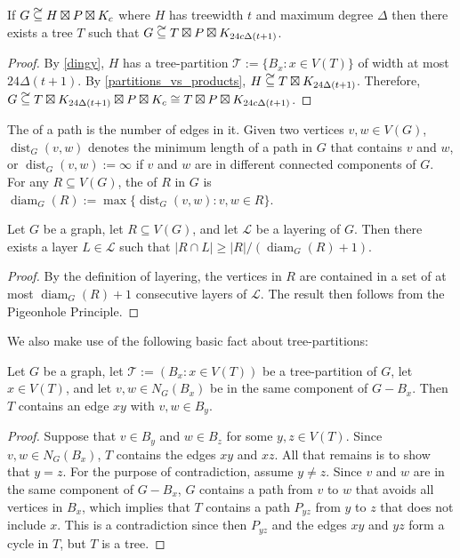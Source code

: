 \documentclass{patmorin}
\DeclareMathOperator{\dist}{dist}
\DeclareMathOperator{\diam}{diam}
\newcommand\subsetcong{\mathrel{\text{%
    \setbox0\hbox{$\subseteq$}%
    \rlap{\hbox to \wd0{\hss\hss\hss\raisebox{1.5\height}{$\sim$}\hss}}\box0
}}}
\renewcommand{\ge}{\geqslant}
\begin{document}
\begin{cor}\label{ding_translation}
  If $G\subsetcong H\boxtimes P\boxtimes K_c$ where $H$ has treewidth $t$ and maximum degree $\Delta$ then there exists a tree $T$ such that $G\subsetcong T\boxtimes P\boxtimes K_{24c\Delta (t+1)}$.
\end{cor}

\begin{proof}
  By \cref{dingy}, $H$ has a tree-partition $\mathcal{T}:=\{B_x:x\in V(T)\}$ of width at most $24\Delta (t+1)$. By \cref{partitions_vs_products}, $H \subsetcong T\boxtimes K_{24\Delta (t+1)}$.  Therefore, $G\subsetcong T\boxtimes K_{24\Delta (t+1)}\boxtimes P\boxtimes K_c \cong T\boxtimes P\boxtimes K_{24c\Delta (t+1)}$.
\end{proof}

The  of a path is the number of edges in it. Given two vertices $v,w\in V(G)$, $\dist_G(v,w)$ denotes the minimum length of a path in $G$ that contains $v$ and $w$, or $\dist_G(v,w):=\infty$ if $v$ and $w$ are in different connected components of $G$. For any $R\subseteq V(G)$, the  of $R$ in $G$ is $\diam_G(R):=\max\{\dist_G(v,w):v,w\in R\}$.

\begin{obs}\label{diameter_spread}
  Let $G$ be a graph, let $R\subseteq V(G)$, and let $\mathcal{L}$ be a layering of $G$.  Then there exists a layer $L\in\mathcal{L}$ such that $|R\cap L|\ge |R|/(\diam_G(R)+1)$.
\end{obs}

\begin{proof}
  By the definition of layering, the vertices in $R$ are contained in a set of at most $\diam_G(R)+1$ consecutive layers of $\mathcal{L}$. The result then follows from the Pigeonhole Principle.
\end{proof}


We also make use of the following basic fact about tree-partitions:

\begin{obs}\label{tree_thingy}
  Let $G$ be a graph, let $\mathcal{T}:=(B_x:x\in V(T))$ be a tree-partition of $G$, let $x\in V(T)$, and let $v,w\in N_G(B_x)$ be in the same component of $G-B_x$.  Then $T$ contains an edge $xy$ with $v,w\in B_y$.
\end{obs}

\begin{proof}
  Suppose that $v\in B_y$ and $w\in B_z$ for some $y,z\in V(T)$.  Since $v,w\in N_G(B_x)$, $T$ contains the edges $xy$ and $xz$.  All that remains is to show that $y=z$. For the purpose of contradiction, assume $y\neq z$.  Since $v$ and $w$ are in the same component of $G-B_x$, $G$ contains a path from $v$ to $w$ that avoids all vertices in $B_x$, which implies that $T$ contains a path $P_{yz}$ from $y$ to $z$ that does not include $x$.  This is a contradiction since then $P_{yz}$ and the edges $xy$ and $yz$ form a cycle in $T$, but $T$ is a tree.
\end{proof}
\end{document}
